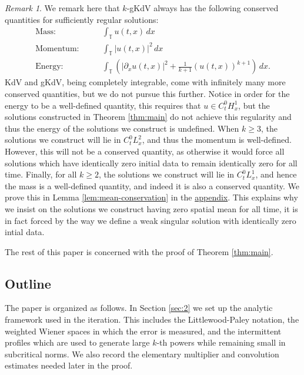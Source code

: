 \documentclass[12pt,reqno,letterpaper]{amsart}
\numberwithin{equation}{section}
\newcommand{\1}{{\bf 1}}
\newcommand{\2}{{\bf 2}}
\newcommand{\T}{\mathbb T}
\theoremstyle{remark}
\newtheorem{remark}[theorem]{Remark}
\theoremstyle{remark}
\begin{document}
\begin{remark}
    We remark here that $k$-\textsf{gKdV} always has the following conserved quantities for sufficiently regular solutions:
    \begin{align*}
        \text{Mass:}& \qquad \int_{\T} u(t,x)\, dx\\
        \text{Momentum:}& \qquad \int_{\T} |u(t,x)|^2\, dx\\
        \text{Energy:}& \qquad \int_{\T} \left(|\partial_x u(t,x)|^2 + \frac{1}{k+1} \left(u(t,x)\right)^{k+1}\right)\, dx.
    \end{align*}
    \textsf{KdV} and \textsf{gKdV}, being completely integrable, come with infinitely many more conserved quantities, but we do not pursue this further. Notice in order for the energy to be a well-defined quantity, this requires that $u \in C_t^0H^1_x$, but the solutions constructed in Theorem \ref{thm:main} do not achieve this regularity and thus the energy of the solutions we construct is undefined. When $k \geq 3$, the solutions we construct will lie in $C_t^0 L^2_x$, and thus the momentum is well-defined. However, this will not be a conserved quantity, as otherwise it would force all solutions which have identically zero initial data to remain identically zero for all time. Finally, for all $k \geq 2$, the solutions we construct will lie in $C_t^0 L^1_x$, and hence the mass is a well-defined quantity, and indeed it is also a conserved quantity. We prove this in Lemma \ref{lem:mean-conservation} in the \hyperref[sec:appendix]{appendix}. This explains why we insist on the solutions we construct having zero spatial mean for all time, it is in fact forced by the way we define a weak singular solution with identically zero intial data.
\end{remark}


The rest of this paper is concerned with the proof of Theorem \ref{thm:main}.












\subsection{Outline}

The paper is organized as follows.  In Section \ref{sec:2} we set up the analytic
framework used in the iteration.  This includes the Littlewood-Paley notation,
the weighted Wiener spaces in which the error is measured, and the intermittent
profiles which are used to generate large $k$-th powers while remaining small
in subcritical norms. We also record the elementary multiplier and convolution
estimates needed later in the proof.
\end{document}
